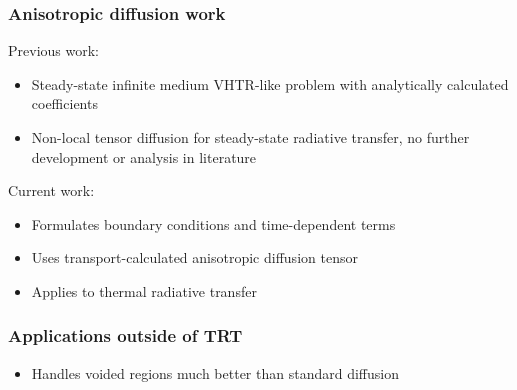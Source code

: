 \documentclass[draft]{beamer}
\begin{document}
\begin{frame}
  \frametitle{Anisotropic diffusion work}
  Previous work:
  \begin{itemize}
    \item Steady-state infinite medium VHTR-like problem with analytically
      calculated coefficients \cite{Lar2009c}
    \item Non-local tensor diffusion \cite{Mor2007} for steady-state
      radiative transfer, no further development or analysis in literature
  \end{itemize}
  Current work:
  \begin{itemize}
    \item Formulates boundary conditions and time-dependent terms
    \item Uses transport-calculated anisotropic diffusion tensor
    \item Applies to thermal radiative transfer
  \end{itemize}
\end{frame}

\begin{frame}
  \frametitle{Applications outside of TRT}
  \begin{itemize}
    \item Handles voided regions much better than standard diffusion
  \end{itemize}
\end{frame}
\end{document}
